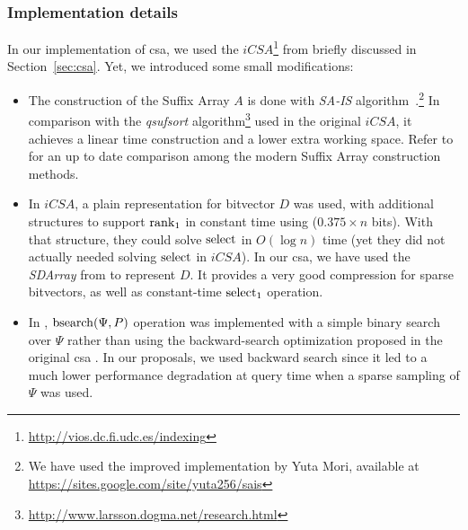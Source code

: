 	\subsubsection{Implementation details} In our implementation of \gls{csa}, we used the
	$iCSA$\footnote{\url{http://vios.dc.fi.udc.es/indexing}} from \cite{FBNCPR12} briefly discussed 
	in Section~\ref{sec:csa}. Yet, we introduced some small modifications:

	\begin{itemize}
		\item The construction of the Suffix Array $A$ is done with 
		{\em SA-IS} algorithm~\cite{nong2011two}.\footnote{We have used the improved implementation by Yuta Mori, available at \url{https://sites.google.com/site/yuta256/sais}} 
		In comparison with the  {\em qsufsort} algorithm\footnote{
			\url{http://www.larsson.dogma.net/research.html}}
		\cite{Larsson:2007:FSS:1314704.1314853} used in the original $iCSA$, it achieves a linear time construction 
		and a lower extra working space. Refer to \cite{magiera2019sacabench} for an up to date comparison among the modern Suffix Array construction methods.
		
		\item In  $iCSA$, a plain representation for bitvector $D$ was used, with additional structures to support
		$\operatorname{rank}_1$ in constant time using ($0.375\times n$ bits). With that structure, they could solve $\operatorname{select}$ in $O(\log n)$ time (yet 
		they did not actually needed solving $\operatorname{select}$ in $iCSA$).
		In our \gls{csa}, we have used the {\em SDArray} from \cite{okanohara2007practical} to represent $D$. It provides a very 
		good compression for sparse bitvectors, as well as constant-time $\operatorname{select}_1$ operation.
		
		\item In \cite{FBNCPR12}, $\operatorname{bsearch}(\Psi,P)$ operation was implemented with a simple binary search over $\Psi$ rather than
		using the backward-search optimization proposed in the original \gls{csa} \cite{Sad03}. In our proposals, we used
		backward search since it led to a much lower performance degradation at query time when a sparse sampling of $\Psi$ 
		was used.
		
	\end{itemize}

